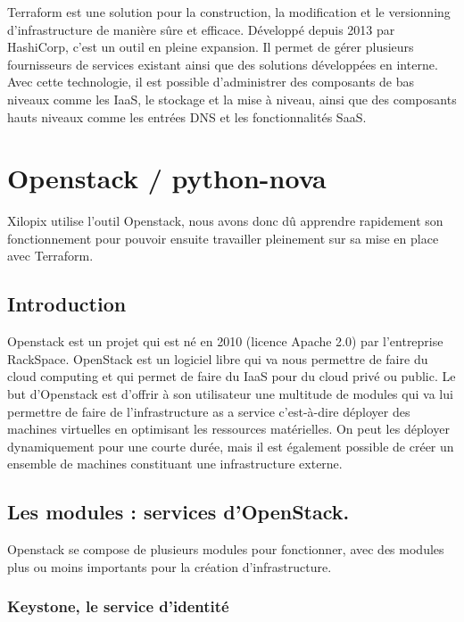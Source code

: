 \documentclass[]{article}
\begin{document}
Terraform est une solution pour la construction, la modification et le
versionning d'infrastructure de manière sûre et efficace. Développé
depuis 2013 par HashiCorp, c'est un outil en pleine expansion. Il permet
de gérer plusieurs fournisseurs de services existant ainsi que des
solutions développées en interne. Avec cette technologie, il est
possible d'administrer des composants de bas niveaux comme les IaaS, le
stockage et la mise à niveau, ainsi que des composants hauts niveaux
comme les entrées DNS et les fonctionnalités SaaS.

\newpage
\section{Openstack / python-nova}\label{openstack-python-nova}

Xilopix utilise l'outil Openstack, nous avons donc dû apprendre
rapidement son fonctionnement pour pouvoir ensuite travailler pleinement
sur sa mise en place avec Terraform.

\subsection{Introduction}\label{introduction-1}

Openstack est un projet qui est né en 2010 (licence Apache 2.0) par
l'entreprise RackSpace. OpenStack est un logiciel libre qui va nous
permettre de faire du cloud computing et qui permet de faire du IaaS
pour du cloud privé ou public. Le but d'Openstack est d'offrir à son
utilisateur une multitude de modules qui va lui permettre de faire de
l'infrastructure as a service c'est-à-dire déployer des machines
virtuelles en optimisant les ressources matérielles. On peut les
déployer dynamiquement pour une courte durée, mais il est également
possible de créer un ensemble de machines constituant une
infrastructure externe.

\subsection{Les modules : services
d'OpenStack.}\label{les-modules-services-dopenstack.}

Openstack se compose de plusieurs modules pour fonctionner, avec des
modules plus ou moins importants pour la création d'infrastructure.

\subsubsection{Keystone, le service
d'identité}\label{keystone-le-service-didentituxe9}
\end{document}
